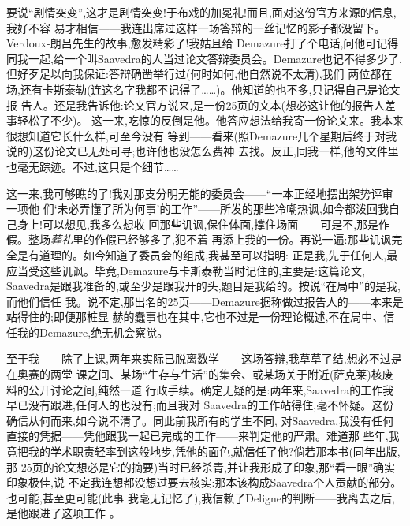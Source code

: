 要说“剧情突变”,这才是剧情突变!于布戏的加冕礼!而且,面对这份官方来源的信息,我好不容
易才相信——我连出席过这样一场答辩的一丝记忆的影子都没留下。Verdoux-朗吕先生的故事,愈发精彩了!我姑且给
Demazure打了个电话,问他可记得同我一起,给一个叫Saavedra的人当过论文答辩委员会。Demazure也记不得多少了,但好歹足以向我保证:答辩确凿举行过(何时如何,他自然说不太清),我们
两位都在场,还有卡斯泰勒(连这名字我都不记得了……)。他知道的也不多,只记得自己是论文报
告人。还是我告诉他:论文官方说来,是一份25页的文本(想必这让他的报告人差事轻松了不少)。
这一来,吃惊的反倒是他。他答应想法给我寄一份论文来。我本来很想知道它长什么样,可至今没有
等到——看来(照Demazure几个星期后终于对我说的)这份论文已无处可寻;也许他也没怎么费神
去找。反正,同我一样,他的文件里也毫无踪迹。不过,这只是个细节……

\pmark{}这一来,我可够瞧的了!我对那支分明无能的委员会——“一本正经地摆出架势评审一项他
们‘未必弄懂了所为何事’的工作”——所发的那些冷嘲热讽,如今都泼回我自己身上!可以想见,我多么想收
回那些讥讽,保住体面,撑住场面——可是不,那是作假。整场\emph{葬礼}里的作假已经够多了,犯不着
再添上我的一份。再说一遍:那些讥讽完全是有道理的。如今知道了委员会的组成,我甚至可以指明:
正是我,先于任何人,最应当受这些讥讽。毕竟,Demazure与卡斯泰勒当时记住的,主要是:这篇论文,
Saavedra是跟我准备的,或至少是跟我开的头,题目是我给的。按说“在局中”的是我,而他们信任
我。说不定,那出名的25页——Demazure据称做过报告人的——本来是站得住的;即便那桩显
赫的蠢事也在其中,它也不过是一份理论概述,不在局中、信任我的Demazure,绝无机会察觉。

至于我——除了上课,两年来实际已脱离数学——这场答辩,我草草了结,想必不过是在奥赛的两堂
课之间、某场“生存与生活”的集会、或某场关于附近(萨克莱)核废料的公开讨论之间,纯然一道
行政手续。确定无疑的是:两年来,Saavedra的工作我早已没有跟进,任何人的也没有;而且我对
Saavedra的工作站得住,毫不怀疑。这份确信从何而来,如今说不清了。同此前我所有的学生不同,
对Saavedra,我没有任何直接的凭据——凭他跟我一起已完成的工作——来判定他的严肃。难道那
些年,我竟把我的学术职责轻率到这般地步,凭他的面色,就信任了他?倘若那本书(同年出版,那
25页的论文想必是它的摘要)当时已经杀青,并让我形成了印象,那“看一眼”确实印象极佳,说
不定我连想都没想过要去核实:那本该构成Saavedra个人贡献的部分。也可能,甚至更可能(此事
我毫无记忆了),我信赖了Deligne的判断——我离去之后,是他跟进了这项工作
。

